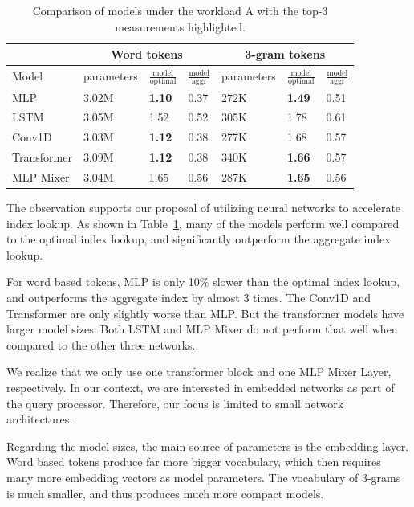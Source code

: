 \documentclass[conference]{IEEEtran}
\begin{document}
\begin{table}[ht]
    \centering
    \begin{tabularx}{\textwidth}{|l|X||X|X||X|X|X|}
    \hline
    &    \multicolumn{3}{|c|}{Word tokens} & \multicolumn{3}{|c|}{3-gram tokens} \\ \hline
    Model 
        & parameters
        & $\frac{\mathrm{model}}{\mathrm{optimal}}$
        & $\frac{\mathrm{model}}{\mathrm{aggr}}$ 
        & parameters
        & $\frac{\mathrm{model}}{\mathrm{optimal}}$
        & $\frac{\mathrm{model}}{\mathrm{aggr}}$
        \\ \hline
    MLP & 3.02M & {\bf 1.10} & 0.37 & 272K & {\bf 1.49} & 0.51\\
    LSTM & 3.05M & 1.52 & 0.52 & 305K & 1.78 & 0.61 \\
    Conv1D & 3.03M & {\bf 1.12} & 0.38 & 277K & 1.68 & 0.57 \\
    Transformer & 3.09M & {\bf 1.12} & 0.38 & 340K & {\bf 1.66} & 0.57 \\
    MLP Mixer & 3.04M & 1.65 & 0.56 & 287K & {\bf 1.65} & 0.56 \\ \hline
    \end{tabularx}
    \caption{Comparison of models under the workload A with the top-3 measurements highlighted.}
    \label{tab:model-comparison}
\end{table}

The observation supports our proposal of utilizing neural networks to accelerate
index lookup.  As shown in Table~\ref{tab:model-comparison}, many of the models perform well compared to the optimal index lookup, and significantly outperform the aggregate index lookup.

For word based tokens, MLP is only 10\% slower than the optimal index lookup, and outperforms the aggregate index by almost 3 times. The Conv1D and Transformer are only slightly worse than MLP. But the transformer models have larger model sizes. Both LSTM and MLP Mixer do not perform that well when compared to the other three networks.

We realize that we only use one transformer block and one MLP Mixer Layer, respectively.  In our context, we are interested in embedded networks as part of the query processor. Therefore, our focus is limited to small network architectures.

Regarding the model sizes, the main source of parameters is the embedding layer.
Word based tokens produce far more bigger vocabulary, which then requires many more
embedding vectors as model parameters.  The vocabulary of 3-grams is much smaller, and thus produces much more compact models.
\end{document}
